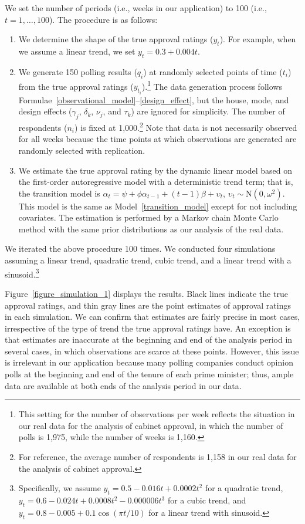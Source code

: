 \documentclass[12pt,letterpaper]{scrartcl}
\let\oldfootnote\footnote
\renewcommand\footnote[1]{\oldfootnote{\hspace{2mm}#1}}
\begin{document}
We set the number of periods (i.e., weeks in our application) to 100 (i.e., $t=1,\ldots ,100$). The procedure is as follows:
\begin{enumerate}
\item We determine the shape of the true approval ratings ($y_{t}$). For example, when we assume a linear trend, we set $y_{t}=0.3 + 0.004t$.
\item We generate 150 polling results ($q_{i}$) at randomly selected points of time ($t_{i}$) from the true approval ratings ($y_{t_{i}}$).\footnote{This setting for the number of observations per week reflects the situation in our real data for the analysis of cabinet approval, in which the number of polls is 1,975, while the number of weeks is 1,160.} The data generation process follows Formulae~\eqref{observational_model}--\eqref{design_effect}, but the house, mode, and design effects ($\gamma _{j}$, $\delta _{k}$, $\nu _{j}$, and $\tau _{k}$) are ignored for simplicity. The number of respondents ($n_{i}$) is fixed at 1,000.\footnote{For reference, the average number of respondents is 1,158 in our real data for the analysis of cabinet approval.} Note that data is not necessarily observed for all weeks because the time points at which observations are generated are randomly selected with replication.
\item We estimate the true approval rating by the dynamic linear model based on the first-order autoregressive model with a deterministic trend term; that is, the transition model is $\alpha _{t}=\psi + \phi \alpha _{t-1}+(t-1)\beta +\upsilon _{t}$, $\upsilon _{t}\sim \mathrm{N}(0,\omega ^{2})$. This model is the same as Model~\ref{transition_model} except for not including covariates. The estimation is performed by a Markov chain Monte Carlo method with the same prior distributions as our analysis of the real data.
\end{enumerate}
We iterated the above procedure 100 times. We conducted four simulations assuming a linear trend, quadratic trend, cubic trend, and a linear trend with a sinusoid.\footnote{Specifically, we assume $y_{t}=0.5-0.016t+0.0002t^{2}$ for a quadratic trend, $y_{t}=0.6-0.024t+0.0008t^{2}-0.000006t^{3}$ for a cubic trend, and $y_{t}=0.8-0.005+0.1\cos (\pi t/10)$ for a linear trend with sinusoid.}

Figure~\ref{figure_simulation_1} displays the results. Black lines indicate the true approval ratings, and thin gray lines are the point estimates of approval ratings in each simulation. We can confirm that estimates are fairly precise in most cases, irrespective of the type of trend the true approval ratings have. An exception is that estimates are inaccurate at the beginning and end of the analysis period in several cases, in which observations are scarce at these points. However, this issue is irrelevant in our application because many polling companies conduct opinion polls at the beginning and end of the tenure of each prime minister; thus, ample data are available at both ends of the analysis period in our data.
\end{document}
